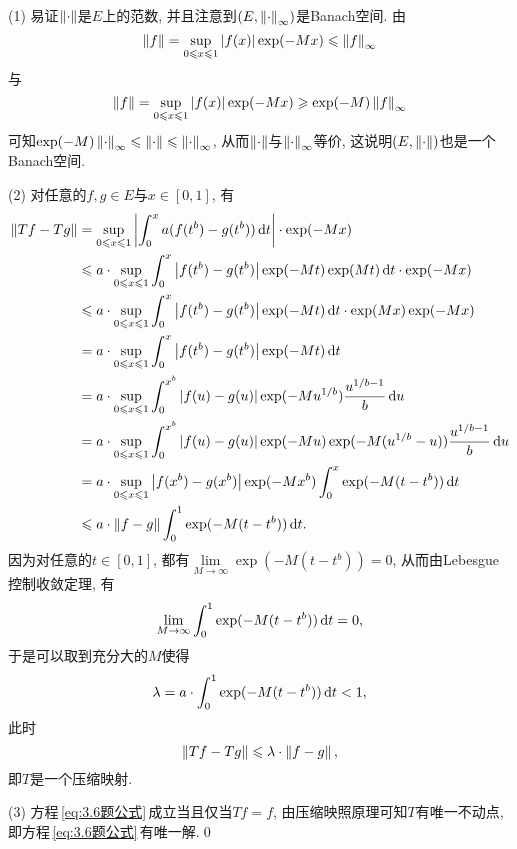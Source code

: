     \begin{Proof}
    (1) 易证$ \left\| \cdot \right\| $是$ E $上的范数, 并且注意到$ (E,\left\| \cdot \right\|_\infty) $是Banach空间. 由
    \[
    \left\| f \right\|=\sup_{0\leqslant x\leqslant 1}\left| f(x) \right| \exp(-Mx)\leqslant\left\| f \right\|_\infty
    \]
    与
    \[
    \left\| f \right\|=\sup_{0\leqslant x\leqslant 1}\left| f(x) \right| \exp(-Mx)\geqslant\exp(-M)\left\| f \right\|_\infty
    \]
    可知$ \exp(-M)\left\| \cdot \right\|_\infty\leqslant\left\| \cdot \right\|\leqslant\left\| \cdot \right\|_\infty $, 从而$ \left\| \cdot \right\| $与$ \left\| \cdot \right\|_\infty $等价, 这说明$ (E,\left\| \cdot \right\|) $也是一个Banach空间.
    
    (2) 对任意的$ f, g\in E $与$ x\in[0,1] $, 有
    \[
    \begin{aligned}
    \left\| Tf-Tg \right\| & =\sup_{0\leqslant x\leqslant 1}\left| \int_0^xa(f(t^b)-g(t^b))\,\mathrm{d} t \right| \cdot\exp(-Mx) \\
    & \leqslant a\cdot\sup_{0\leqslant x\leqslant 1}\int_0^x\left| f(t^b)-g(t^b) \right| \exp(-Mt)\exp(Mt)\,\mathrm{d} t\cdot\exp(-Mx) \\
    & \leqslant a\cdot\sup_{0\leqslant x\leqslant 1}\int_0^x\left| f(t^b)-g(t^b) \right| \exp(-Mt)\,\mathrm{d} t\cdot\exp(Mx)\exp(-Mx) \\
    & =a\cdot\sup_{0\leqslant x\leqslant 1}\int_0^x\left| f(t^b)-g(t^b) \right| \exp(-Mt)\,\mathrm{d} t\\
    & =a\cdot\sup_{0\leqslant x\leqslant 1}\int_0^{x^b}\left| f(u)-g(u) \right| \exp(-Mu^{1/b})\frac{u^{1/b-1}}{b}\,\mathrm{d} u\\
    & =a\cdot\sup_{0\leqslant x\leqslant 1}\int_0^{x^b}\left| f(u)-g(u) \right| \exp(-Mu)\exp(-M(u^{1/b}-u))\frac{u^{1/b-1}}{b}\,\mathrm{d} u\\
    & =a\cdot\sup_{0\leqslant x\leqslant 1}\left| f(x^b)-g(x^b) \right| \exp(-Mx^b)\int_0^x\exp(-M(t-t^b))\,\mathrm{d} t\\
    & \leqslant a\cdot\left\| f-g \right\|\int_0^1\exp(-M(t-t^b))\,\mathrm{d} t.
    \end{aligned}
    \]
    因为对任意的$ t\in[0,1] $, 都有$ \lim\limits_{M\to\infty}\exp(-M(t-t^b))=0 $, 从而由Lebesgue控制收敛定理, 有
    \[
    \lim_{M\to\infty}\int_0^1\exp(-M(t-t^b))\,\mathrm{d} t=0,
    \]
    于是可以取到充分大的$ M $使得
    \[
    \lambda=a\cdot\int_0^1\exp(-M(t-t^b))\,\mathrm{d} t<1,
    \]
    此时
    \[
    \left\| Tf-Tg \right\|\leqslant\lambda\cdot\left\| f-g \right\|,
    \]
    即$ T $是一个压缩映射.
    
    (3) 方程\,\eqref{eq:3.6题公式}\,成立当且仅当$ Tf=f $, 由压缩映照原理可知$ T $有唯一不动点, 即方程\,\eqref{eq:3.6题公式}\,有唯一解.\qed
    \end{Proof}
    
